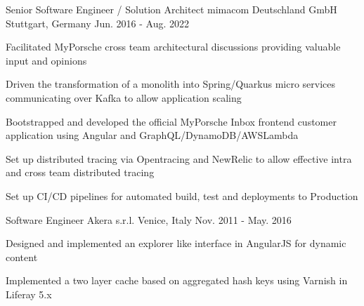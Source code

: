 \begin{cventries}
  \cventry
    {Senior Software Engineer / Solution Architect} %
    {mimacom Deutschland GmbH} %
    {Stuttgart, Germany} %
    {Jun. 2016 - Aug. 2022} %
    {
      \begin{cvitems} %
        \item {Facilitated MyPorsche cross team architectural discussions providing valuable input and opinions}
        \item {Driven the transformation of a monolith into Spring/Quarkus micro services communicating over Kafka to allow application scaling}
        \item {Bootstrapped and developed the official MyPorsche Inbox frontend customer application using Angular and GraphQL/DynamoDB/AWSLambda}
        \item {Set up distributed tracing via Opentracing and NewRelic to allow effective intra and cross team distributed tracing}
        \item {Set up CI/CD pipelines for automated build, test and deployments to Production}
      \end{cvitems}
    }

  \cventry
    {Software Engineer} %
    {Akera s.r.l.} %
    {Venice, Italy} %
    {Nov. 2011 - May. 2016} %
    {
      \begin{cvitems} %
        \item {Designed and implemented an explorer like interface in AngularJS for dynamic content}
        \item {Implemented a two layer cache based on aggregated hash keys using Varnish in Liferay 5.x}
      \end{cvitems}
    }

\end{cventries}
